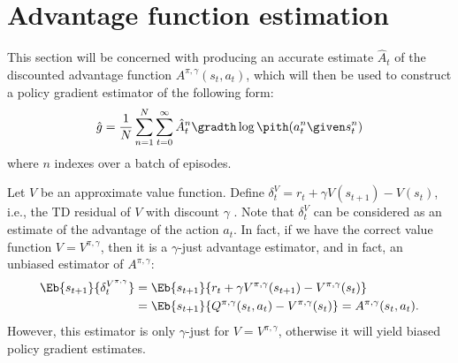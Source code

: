 \documentclass{article}
\newcommand{\dv}{\delta^V}
\newcommand{\hata}{\hat{A}}
\newcommand{\Apigam}{A^{\pi,\gamma}}
\newcommand{\Qpigam}{Q^{\pi,\gamma}}
\newcommand{\Vpigam}{V^{\pi,\gamma}}
\newcommand{\just}{$\gamma$-just}
\begin{document}
\section{Advantage function estimation} \label{sec:advest}

\newcommand{\fut}{\substack{s_{t+1:\infty}\\ a_{t+1:\infty}}}

This section will be concerned with producing an accurate estimate $\hata_t$ of the discounted advantage function $\Apigam(s_t, a_t)$, which will then be used to construct a policy gradient estimator of the following form:
\begin{align}
\hat g = \frac{1}{N} \sum_{n=1}^N \sum_{t=0}^{\infty} \hata_t^n \gradth \log \pith(a_t^n \given s_t^n)
\label{eq:pg-gae}
\end{align}
where $n$ indexes over a batch of episodes.

Let $V$ be an approximate value function.
Define $\delta^V_t = r_t + \gamma V(s_{t+1}) - V(s_t)$, i.e., the TD residual of $V$ with discount $\gamma$ \citep{sutton1998introduction}.
Note that $\dv_t$ can be considered as an
estimate of the advantage of the action $a_t$. In fact, if we have the correct value function $V=\Vpigam$, then it is a \just{} advantage estimator, and in fact, an unbiased estimator of $\Apigam$:
\begin{align}
\Eb{s_{t+1}}{\delta^{\Vpigam}_t} &= \Eb{s_{t+1}}{r_t + \gamma \Vpigam(s_{t+1}) - \Vpigam(s_t)} \nonumber \\
&= \Eb{s_{t+1}}{\Qpigam(s_t, a_t) - \Vpigam(s_t)}= \Apigam(s_t, a_t).
\end{align}
However, this estimator is only \just{} for $V = \Vpigam$, otherwise it will yield biased policy gradient estimates.
\end{document}

